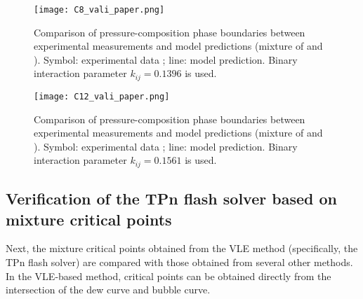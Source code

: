     \begin{figure}[htbp]
        \centering
        \texttt{[image: C8\_vali\_paper.png]}
        \centering
        \caption{Comparison of pressure-composition phase boundaries between experimental measurements and model predictions (mixture of  and ). Symbol: experimental data \citep{llave1988vapor}; line: model prediction. Binary interaction parameter $k_{ij}=0.1396$ is used.}
        \label{C8_vali}
    \end{figure}

    \begin{figure}[htbp]
        \centering
        \texttt{[image: C12\_vali\_paper.png]}
        \centering
        \caption{Comparison of pressure-composition phase boundaries between experimental measurements and model predictions (mixture of  and ). Symbol: experimental data \citep{garcia2011vapor}; line: model prediction. Binary interaction parameter $k_{ij}=0.1561$ is used.}
        \label{C12_vali}
    \end{figure}

    
    \subsection{Verification of the TPn flash solver based on mixture critical points}
    Next, the mixture critical points obtained from the VLE method (specifically, the TPn flash solver) are compared with those obtained from several other methods. In the VLE-based method, critical points can be obtained directly from the intersection of the dew curve and bubble curve.

